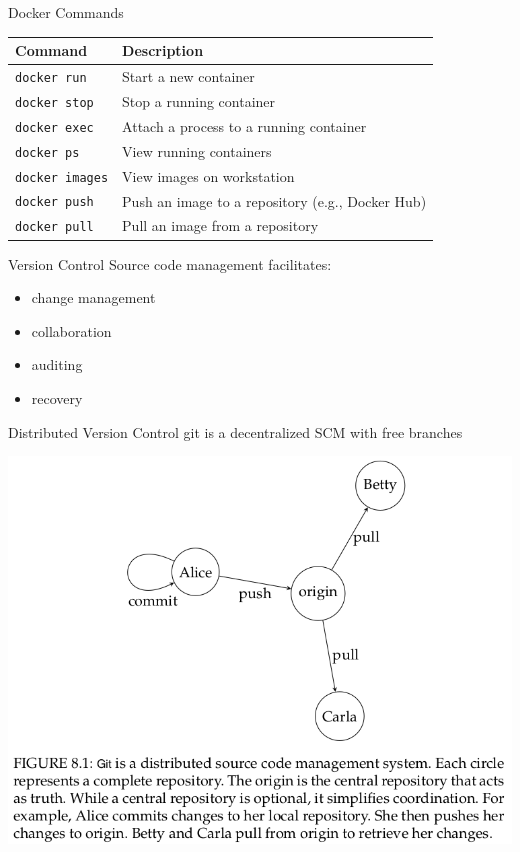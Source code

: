 \documentclass{beamer}
\begin{document}
\begin{frame}{Docker Commands}

\begin{tabu} to \linewidth{lX}
Command & Description\\
\hline
\lstinline|docker run| & Start a new container\\
\lstinline|docker stop| & Stop a running container\\
\lstinline|docker exec| & Attach a process to a running container\\
\lstinline|docker ps| & View running containers\\
\lstinline|docker images| & View images on workstation\\
\lstinline|docker push| & Push an image to a repository (e.g., Docker Hub)\\
\lstinline|docker pull| & Pull an image from a repository\\
\end{tabu}
\end{frame}




\begin{frame}[fragile]{Version Control}
Source code management facilitates:

\begin{itemize}
\item change management
\item collaboration
\item auditing
\item recovery
\end{itemize}
\end{frame}


\begin{frame}[fragile]{Distributed Version Control}
git is a decentralized SCM with \alert{free branches}

\includegraphics[width=.8\linewidth]{images/git_interactions}
\end{frame}
\end{document}
